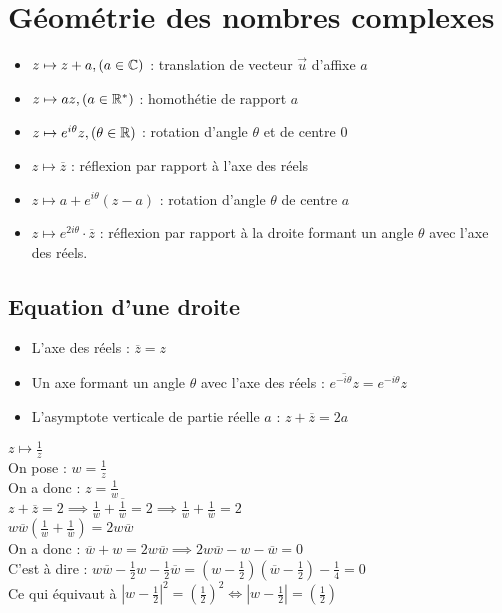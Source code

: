 \section{Géométrie des nombres complexes}
\begin{itemize}
    \item $z \mapsto z + a, (a \in \mathbb{C})$ : translation de vecteur $\vec{u}$ d'affixe $a$
    \item $z \mapsto az, (a \in \mathbb{R}^*)$ : homothétie de rapport $a$
    \item $z \mapsto e^{i\theta}z, (\theta \in \mathbb{R})$ : rotation d'angle $\theta$ et de centre $0$
    \item $z \mapsto \overline{z}$ : réflexion par rapport à l'axe des réels
    \item $z \mapsto a + e^{i\theta} (z - a)$ : rotation d'angle $\theta$ de centre $a$
    \item $z \mapsto e^{2i\theta} \cdot \overline{z}$ : réflexion par rapport à la droite formant un angle $\theta$ avec l'axe des réels.
\end{itemize}

\subsection{Equation d'une droite}
\begin{itemize}
    \item L'axe des réels : $\overline{z} = z$
    \item Un axe formant un angle $\theta$ avec l'axe des réels : $\overline{e^{-i\theta}z}= e^{-i\theta}z$
    \item L'asymptote verticale de partie réelle $a$ : $z + \overline{z} = 2a$
\end{itemize}


\begin{exemple}
    $z \mapsto \frac{1}{z}$ 
    \\
    On pose : $w = \frac{1}{z}$
    \\
    On a donc : $z = \frac{1}{w}$
    \\
    $z + \overline{z} = 2 \implies \frac{1}{w} + \overline{\frac{1}{w}} = 2 \implies \frac{1}{w} + \frac{1}{\overline{w}} = 2$ \\
    $w\overline{w} \left( \frac{1}{w} + \frac{1}{\overline{w}} \right) = 2w\overline{w}$
    \\
    On a donc : $\overline{w} + w = 2w\overline{w} \implies 2w\overline{w} - w - \overline{w} = 0$ 
    \\
    C'est à dire : $w\overline{w} - \frac{1}{2}w - \frac{1}{2}\overline{w} = \left( w - \frac{1}{2} \right) \left( \overline{w} - \frac{1}{2} \right) - \frac{1}{4} = 0$
    \\
    Ce qui équivaut à $\left| w - \frac{1}{2} \right|^2 = \left( \frac{1}{2} \right)^2 \iff \left|w - \frac{1}{2}\right| = \left(\frac{1}{2}\right)$
\end{exemple}



